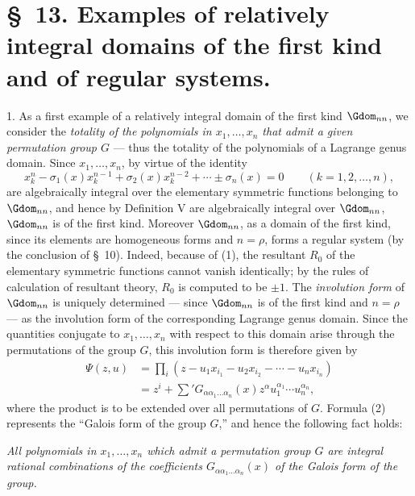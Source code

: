 \documentclass[11pt]{article}
\begin{document}
\section*{\S\ 13. Examples of relatively integral domains of the first kind and of regular systems.}

1. As a first example of a relatively integral domain of the first kind $\Gdom_{nn}$, we consider the \emph{totality of the polynomials in $x_1,
\ldots,x_n$ that admit a given permutation group $G$} --- thus the totality of the polynomials of a Lagrange genus domain. Since $x_1,
\ldots,x_n$, by virtue of the identity
\begin{equation}
  x_k^n-\sigma_1(x)x_k^{n-1}+\sigma_2(x)x_k^{n-2}+\cdots\pm\sigma_n(x)=0
  \qquad(k=1,2,
\ldots,n),
\tag{1}
\end{equation}
are algebraically integral over the elementary symmetric functions belonging to $\Gdom_{nn}$, and hence by Definition V are algebraically integral over $\Gdom_{nn}$, $\Gdom_{nn}$ is of the first kind. Moreover $\Gdom_{nn}$, as a domain of the first kind, since its elements are homogeneous forms and $n=\rho$, forms a regular system (by the conclusion of \S\ 10). Indeed, because of (1), the resultant $R_0$ of the elementary symmetric functions cannot vanish identically; by the rules of calculation of resultant theory, $R_0$ is computed to be $\pm1$. The \emph{involution form} of $\Gdom_{nn}$ is uniquely determined --- since $\Gdom_{nn}$ is of the first kind and $n=\rho$ --- as the involution form of the corresponding Lagrange genus domain. Since the quantities conjugate to $x_1,
\ldots,x_n$ with respect to this domain arise through the permutations of the group $G$, this involution form is therefore given by
\begin{equation}
\begin{aligned}
  \Psi(z,u)&=\prod_i
  (z-u_1x_{i_1}-u_2x_{i_2}-\cdots-u_nx_{i_n})\\
  &=z^i+\sum{}'G_{\alpha\alpha_1\ldots\alpha_n}(x)
  z^\alpha u_1^{\alpha_1}\cdots u_n^{\alpha_n},
\end{aligned}
\tag{2}
\end{equation}
where the product is to be extended over all permutations of $G$. Formula (2) represents the ``Galois form of the group $G$,'' and hence the following fact holds:

\emph{All polynomials in $x_1,
\ldots,x_n$ which admit a permutation group $G$ are integral rational combinations of the coefficients $G_{\alpha\alpha_1\ldots\alpha_n}(x)$ of the Galois form of the group.}
\end{document}
